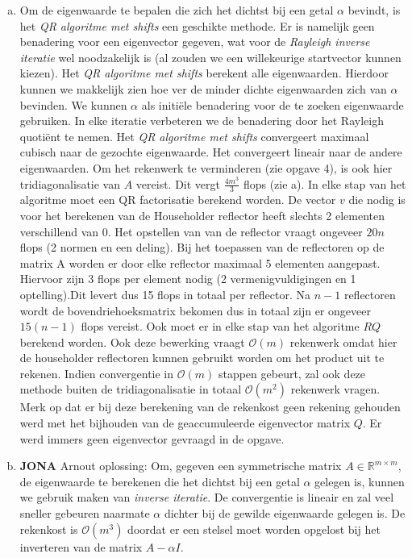 \documentclass[a4paper]{article}
\begin{document}
\begin{enumerate}[a)]
\item
Om de eigenwaarde te bepalen die zich het dichtst bij een getal $\alpha$ bevindt, is het \textit{QR algoritme met shifts} een geschikte methode. Er is namelijk geen benadering voor een eigenvector gegeven, wat voor de \textit{Rayleigh inverse iteratie} wel noodzakelijk is (al zouden we een willekeurige startvector kunnen kiezen). Het \textit{QR algoritme met shifts} berekent alle eigenwaarden. Hierdoor kunnen we makkelijk zien hoe ver de minder dichte eigenwaarden zich van $\alpha$ bevinden. We kunnen $\alpha$ als initi\"ele benadering voor de te zoeken eigenwaarde gebruiken. In elke iteratie verbeteren we de benadering door het Rayleigh quoti\"ent te nemen. Het \textit{QR algoritme met shifts} convergeert maximaal cubisch naar de gezochte eigenwaarde. Het convergeert lineair naar de andere eigenwaarden. Om het rekenwerk te verminderen (zie opgave 4), is ook hier tridiagonalisatie van $A$ vereist. Dit vergt  $\frac{4m^{3}}{3}$ flops (zie a). In elke stap van het algoritme moet een QR factorisatie berekend worden. De vector $v$ die nodig is voor het berekenen van de Householder reflector heeft slechts 2 elementen verschillend van 0. Het opstellen van van de reflector vraagt ongeveer $20n$ flops (2 normen en een deling). Bij het toepassen van de reflectoren op de matrix A worden er door elke reflector maximaal 5 elementen aangepast. Hiervoor zijn 3 flops per element nodig (2 vermenigvuldigingen en 1 optelling).Dit levert dus 15 flops in totaal per reflector. Na $n-1$ reflectoren wordt de bovendriehoeksmatrix bekomen dus in totaal zijn er ongeveer $15(n-1)$ flops vereist. Ook moet er in elke stap van het algoritme $RQ$ berekend worden. Ook deze bewerking vraagt $\mathcal{O}(m)$ rekenwerk omdat hier de householder reflectoren kunnen gebruikt worden om het product uit te rekenen. Indien convergentie in $\mathcal{O}(m)$ stappen gebeurt, zal ook deze methode buiten de tridiagonalisatie in totaal $\mathcal{O} (m^2)$ rekenwerk vragen. Merk op dat er bij deze berekening van de rekenkost geen rekening gehouden werd met het bijhouden van de geaccumuleerde eigenvector matrix $Q$. Er werd immers geen eigenvector gevraagd in de opgave.

\item \textbf{JONA} Arnout oplossing: Om, gegeven een symmetrische matrix $A \in \mathbb{R}^{m\times m}$, de eigenwaarde te berekenen die het dichtst bij een getal $\alpha$ gelegen is, kunnen we gebruik maken van \textit{inverse iteratie}. De convergentie is lineair en zal veel sneller gebeuren naarmate $\alpha$ dichter bij de gewilde eigenwaarde gelegen is. De rekenkost is $\mathcal{O} (m^3)$ doordat er een stelsel moet worden opgelost bij het inverteren van de matrix $A-\alpha I$.
\end{enumerate}
\end{document}
